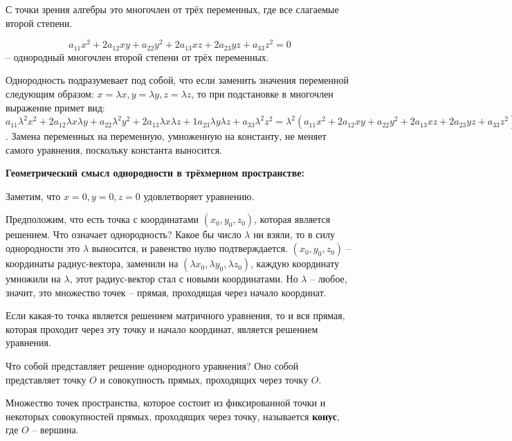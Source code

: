   С точки зрения алгебры это многочлен от трёх переменных, где все слагаемые второй степени.

	\begin{Def}
    $$a_{11} x^2 + 2 a_{12}xy + a_{22} y^2 + 2 a_{13}xz + 2 a_{23}yz + a_{33}z^2 = 0$$ -- однородный многочлен второй степени от трёх переменных.
  \end{Def}

  Однородность подразумевает под собой, что если заменить значения переменной следующим образом: $x = \lambda x, y = \lambda y, z = \lambda z$, то при подстановке в многочлен выражение примет вид:\\
  $a_{11} \lambda^2 x^2 + 2 a_{12} \lambda x \lambda y + a_{22} \lambda^2 y^2 + 2 a_{13} \lambda x \lambda z + 1 a_{23} \lambda y \lambda z + a_{33} \lambda^2z^2 = \lambda^2(a_{11} x^2 + 2 a_{12}xy + a_{22} y^2 + 2 a_{13}xz + 2 a_{23}yz + a_{33}z^2) = 0$.
  Замена переменных на переменную, умноженную на константу, не меняет самого уравнения, поскольку константа выносится.

  \textbf{Геометрический смысл однородности в трёхмерном пространстве:}

  Заметим, что $x = 0, y = 0, z = 0$ удовлетворяет уравнению.

  Предположим, что есть точка с координатами $(x_0, y_0, z_0)$, которая является решением. Что означает однородность? Какое бы число $\lambda$ ни взяли, то в силу однородности это $\lambda$ выносится, и равенство нулю подтверждается.
  $(x_0, y_0, z_0)$ -- координаты радиус-вектора, заменили на $(\lambda x_0, \lambda y_0, \lambda z_0)$, каждую координату умножили на $\lambda$, этот радиус-вектор стал с новыми координатами. Но $\lambda$ -- любое, значит, это множество точек -- прямая, проходящая через начало координат.

  \begin{figure}[h]
    \centering
    \def\svgwidth{0.4\columnwidth}
    
  \end{figure}

  Если какая-то точка является решением матричного уравнения, то и вся прямая, которая проходит через эту точку и начало координат, является решением уравнения.

  Что собой представляет решение однородного уравнения? Оно собой представляет точку $O$ и совокупность прямых, проходящих через точку $O$.

  \begin{Def}
    Множество точек пространства, которое состоит из фиксированной точки и некоторых совокупностей прямых, проходящих через точку, называется \textbf{конус}, где $O$ -- вершина.
  \end{Def}

